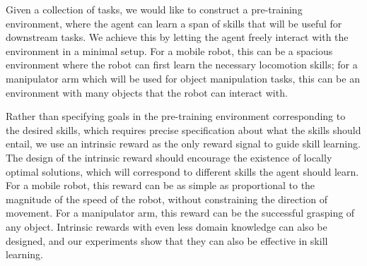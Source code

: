 \documentclass{article} %
\begin{document}
Given a collection of tasks, we would like to construct a pre-training environment, where the agent can learn a span of skills that will be useful for downstream tasks. We achieve this by letting the agent freely interact with the environment in a minimal setup.
For a mobile robot, this can be a spacious environment where the robot can first learn the necessary locomotion skills; for a manipulator arm which will be used for object manipulation tasks, this can be an environment with many objects that the robot can interact with.

Rather than specifying goals in the pre-training environment corresponding to the desired skills, which requires precise specification about what the skills should entail, we use an intrinsic reward as the only reward signal to guide skill learning.
The design of the intrinsic reward should encourage the existence of locally optimal solutions, which will correspond to different skills the agent should learn.
For a mobile robot, this reward can be as simple as proportional to the magnitude of the speed of the robot, without constraining the direction of movement.
For a manipulator arm, this reward can be the successful grasping of any object.
Intrinsic rewards with even less domain knowledge can also be designed, and our experiments show that they can also be effective in skill learning.


\end{document}
